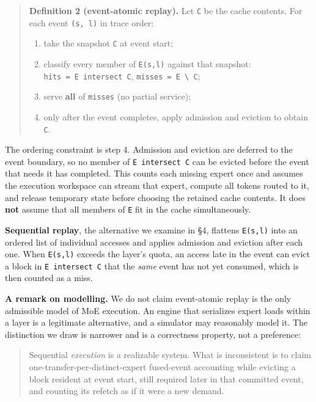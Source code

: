 \documentclass[
  10pt,
  letterpaper,
  10pt]{article}
\providecommand{\tightlist}{%
  \setlength{\itemsep}{0pt}\setlength{\parskip}{0pt}}
\begin{document}
\begin{quote}
\textbf{Definition 2 (event-atomic replay).} Let \texttt{C} be the cache
contents. For each event \texttt{(s,\ l)} in trace order:

\begin{enumerate}
\def\labelenumi{\arabic{enumi}.}
\tightlist
\item
  take the snapshot \texttt{C} at event start;
\item
  classify every member of \texttt{E(s,l)} against that snapshot:
  \texttt{hits\ =\ E\ intersect\ C},
  \texttt{misses\ =\ E\ \textbackslash{}\ C};
\item
  serve \textbf{all} of \texttt{misses} (no partial service);
\item
  only after the event completes, apply admission and eviction to obtain
  \texttt{C\textquotesingle{}}.
\end{enumerate}
\end{quote}

The ordering constraint is step 4. Admission and eviction are deferred
to the event boundary, so no member of \texttt{E\ intersect\ C} can be
evicted before the event that needs it has completed. This counts each
missing expert once and assumes the execution workspace can stream that
expert, compute all tokens routed to it, and release temporary state
before choosing the retained cache contents. It does \textbf{not} assume
that all members of \texttt{E} fit in the cache simultaneously.

\textbf{Sequential replay}, the alternative we examine in §4, flattens
\texttt{E(s,l)} into an ordered list of individual accesses and applies
admission and eviction after each one. When
\texttt{\textbar{}E(s,l)\textbar{}} exceeds the layer's quota, an access
late in the event can evict a block in \texttt{E\ intersect\ C} that the
\emph{same} event has not yet consumed, which is then counted as a miss.

\textbf{A remark on modelling.} We do not claim event-atomic replay is
the only admissible model of MoE execution. An engine that serializes
expert loads within a layer is a legitimate alternative, and a simulator
may reasonably model it. The distinction we draw is narrower and is a
correctness property, not a preference:

\begin{quote}
Sequential \emph{execution} is a realizable system. What is inconsistent
is to claim one-transfer-per-distinct-expert fused-event accounting
while evicting a block resident at event start, still required later in
that committed event, and counting its refetch as if it were a new
demand.
\end{quote}
\end{document}

